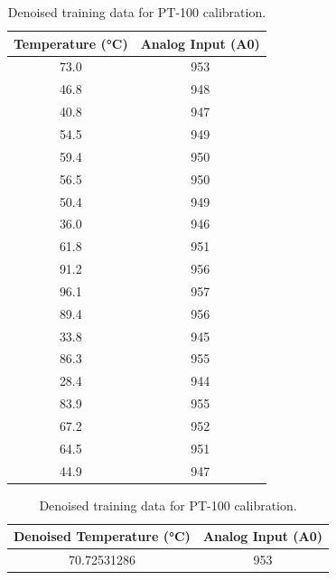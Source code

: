 \documentclass[journal,onecolumn]{IEEEtran}
\begin{document}
	\begin{table}[h]
		\centering
		\begin{minipage}[b]{0.45\textwidth}
			\centering
			\caption{Training data for PT-100 calibration.}
			\label{tab:training_data}
			\begin{tabular}{@{}cc@{}}
				\toprule
				Temperature (°C) & Analog Input (A0) \\ \midrule
				73.0                 & 953         \\
				46.8                 & 948         \\
				40.8                 & 947         \\
				54.5                 & 949         \\
				59.4                 & 950         \\
				56.5                 & 950         \\
				50.4                 & 949         \\
				36.0                 & 946         \\
				61.8                 & 951         \\
				91.2                 & 956         \\
				96.1                 & 957         \\
				89.4                 & 956         \\
				33.8                 & 945         \\
				86.3                 & 955         \\
				28.4                 & 944         \\
				83.9                 & 955         \\
				67.2                 & 952         \\
				64.5                 & 951         \\
				44.9                 & 947         \\ \bottomrule
			\end{tabular}
		\end{minipage}
		\hspace{0.009\textwidth}
		\begin{minipage}[b]{0.45\textwidth}
			\centering
			\caption{Denoised training data for PT-100 calibration.}
			\label{tab:denoised_training_data}
			\begin{tabular}{@{}cc@{}}
				\toprule
				Denoised Temperature (°C) & Analog Input (A0) \\ \midrule
				70.72531286              & 953        \\

\end{tabular}
\end{minipage}
\end{table}
\end{document}
